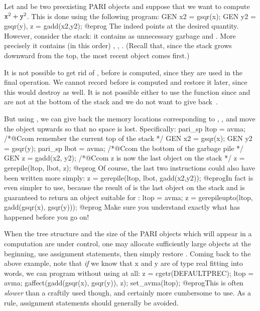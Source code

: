 

Let  and  be two preexisting PARI objects and suppose that we
want to compute ${\tt x}^2 + {\tt y}^2$. This is done using the following
program:
\bprog
  GEN x2 = gsqr(x);
  GEN y2 = gsqr(y), z = gadd(x2,y2);
@eprog\noindent
The   indeed points at the desired quantity. However,
consider the stack: it contains as unnecessary garbage  and .
More precisely it contains (in this order) , , .
(Recall that, since the stack grows downward from the top, the most recent
object comes first.)

It is not possible to get rid of ,  before  is
computed, since they are used in the final operation. We cannot record
 before  is computed and restore it later, since this would
destroy  as well. It is not possible either to use the function
 since  and  are not at the bottom of the stack and
we do not want to give back~.

But using , we can give back the memory locations corresponding
to , , and move the object  upwards so that no
space is lost. Specifically:
\bprog
  pari_sp ltop = avma;  /*@Ccom remember the current top of the stack */
  GEN x2 = gsqr(x);
  GEN y2 = gsqr(y);
  pari_sp lbot = avma;  /*@Ccom the bottom of the garbage pile */
  GEN z = gadd(x2, y2); /*@Ccom z is now the last object on the stack */
  z = gerepile(ltop, lbot, z);
@eprog
\noindent Of course, the last two instructions could also have been
written more simply:
\bprog
  z = gerepile(ltop, lbot, gadd(x2,y2));
@eprog\noindent In fact  is even simpler to use, because
the result of  is the last object on the stack and 
is guaranteed to return an object suitable for :
\bprog
  ltop = avma;
  z = gerepileupto(ltop, gadd(gsqr(x), gsqr(y)));
@eprog\noindent
Make sure you understand exactly what has happened before you go on!

 When the tree structure and
the size of the PARI objects which will appear in a computation are under
control, one may allocate sufficiently large objects at the beginning,
use assignment statements, then simply restore . Coming back to the
above example, note that \emph{if} we know that x and y are of type real
fitting into  words, we can program without using
 at all:
\bprog
  z = cgetr(DEFAULTPREC); ltop = avma;
  gaffect(gadd(gsqr(x), gsqr(y)), z);
  set_avma(ltop);
@eprog\noindent This is often \emph{slower} than a craftily used
 though, and certainly more cumbersome to use. As a rule,
assignment statements should generally be avoided.

